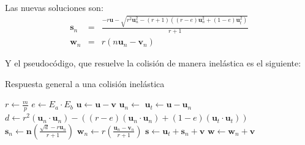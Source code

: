 Las nuevas soluciones son: 
\begin{eqnarray}
\textbf{s}_n & = & \frac{-r\textbf{u} - \sqrt{r^{2} \textbf{u}_{n}^{2} - \left( r + 1\right)  \left( (r - e) \textbf{u}_{n}^{2} + (1 -e) \textbf{u}_{t}^{2} \right) } } { r + 1} \nonumber \\
\textbf{w}_n & = & r \left(  n \textbf{u}_n - \textbf{v}_n \right) \nonumber
\end{eqnarray}

Y el pseudocódigo, que resuelve la colisión de manera inelástica es el siguiente:

{\centering
\begin{minipage}{\linewidth}
  \begin{algorithm}[H]
    \caption{Respuesta general a una colisión inelástica}
    \label{alg:inelas}
    \begin{algorithmic}[1] %
\State $r \gets \frac{m}{p}$
\State $e \gets E_a \cdot E_b$
\State $\textbf{u} \gets \textbf{u} - \textbf{v}$
\State $\textbf{u}_n \gets$ 
\State $\textbf{u}_t \gets \textbf{u} - \textbf{u}_n$
\State $ d \gets r^{2} \left(  \textbf{u}_n \cdot \textbf{u}_n \right) - \left( (r - e) (\textbf{u}_n \cdot \textbf{u}_n) + (1 - e) (\textbf{u}_t \cdot \textbf{u}_t) \right) $
\State $\textbf{s}_n \gets \textbf{n} \left( \frac{ \sqrt{d} - r \textbf{u}_n }{r + 1} \right) $
\State $\textbf{w}_n \gets r \left( \frac{\textbf{u}_n - \textbf{v}_n}{r + 1} \right) $
\State $\textbf{s} \gets \textbf{u}_t + \textbf{s}_n + \textbf{v}$
\State $\textbf{w} \gets \textbf{w}_n + \textbf{v}$
\State {}
\EndProcedure
    \end{algorithmic}
  \end{algorithm}
\end{minipage}
\par
}

